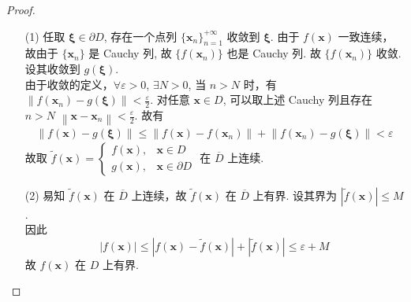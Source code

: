 \documentclass{article}
\begin{document}
\begin{proof}
    \begin{itemize}
        \item [(1)] 任取 $\boldsymbol{\xi} \in \partial D$, 存在一个点列 $\{\boldsymbol{x}_n\}_{n = 1}^{+\infty}$ 收敛到 $\boldsymbol{\xi}$. 由于 $f(\boldsymbol{x})$ 一致连续，故由于 $\{\boldsymbol{x}_n\}$ 是 Cauchy 列, 故 $\{f(\boldsymbol{x}_n)\}$ 也是 Cauchy 列. 故 $\{f(\boldsymbol{x}_n)\}$ 收敛. 设其收敛到 $g(\boldsymbol{\xi})$. \\
        由于收敛的定义，$\forall \varepsilon > 0$, $\exists N > 0$, 当 $n > N$ 时，有 $\left\lVert f(\boldsymbol{x}_n) - g(\boldsymbol{\xi})\right\rVert < \frac{\varepsilon}{2}$. 对任意 $\boldsymbol{x} \in D$, 可以取上述 Cauchy 列且存在 $n > N$ $\left\lVert \boldsymbol{x} - \boldsymbol{x}_n\right\rVert < \frac{\varepsilon}{2}$. 故有
        \begin{align*}
            \left\lVert f(\boldsymbol{x}) - g(\boldsymbol{\xi})\right\rVert \leq \left\lVert f(\boldsymbol{x}) - f(\boldsymbol{x}_n)\right\rVert + \left\lVert f(\boldsymbol{x}_n) - g(\boldsymbol{\xi})\right\rVert < \varepsilon
        \end{align*}
        故取 $\tilde{f}(\boldsymbol{x}) = \begin{cases}
            f(\boldsymbol{x}), & \boldsymbol{x} \in D \\
            g(\boldsymbol{x}), & \boldsymbol{x} \in \partial D
        \end{cases}$ 在 $\overline{D}$ 上连续.
        \item [(2)] 易知 $\tilde{f}(\boldsymbol{x})$ 在 $\overline{D}$ 上连续，故 $\tilde{f}(\boldsymbol{x})$ 在 $\overline{D}$ 上有界. 设其界为 $\left\lvert \tilde{f}(\boldsymbol{x})\right\rvert \leq M$. \\
        因此 $$\left\lvert f(\boldsymbol{x})\right\rvert \leq \left\lvert f(\boldsymbol{x}) - \tilde{f}(\boldsymbol{x})\right\rvert + \left\lvert \tilde{f}(\boldsymbol{x})\right\rvert \leq \varepsilon + M$$
        故 $f(\boldsymbol{x})$ 在 $D$ 上有界.
    \end{itemize}
\end{proof}
\end{document}
